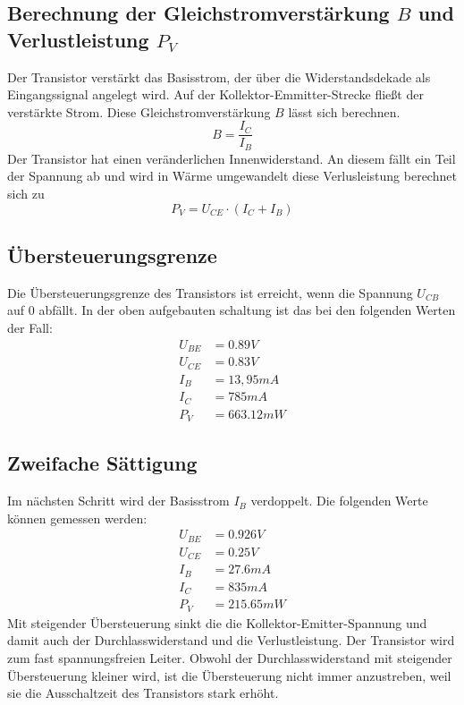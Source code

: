 \documentclass[
a4paper,     %
 headsepline, %
11pt         %
]{scrartcl}  %
\begin{document}
\subsection{Berechnung der Gleichstromverstärkung $B$ und Verlustleistung $P_V$}
Der Transistor verstärkt das Basisstrom, der über die Widerstandsdekade als Eingangssignal angelegt wird. Auf der Kollektor-Emmitter-Strecke fließt der verstärkte Strom. Diese Gleichstromverstärkung $B$ lässt sich berechnen.
\[B=\frac{I_C}{I_B}\]
Der Transistor hat einen veränderlichen Innenwiderstand. An diesem fällt ein Teil der Spannung ab und wird in Wärme umgewandelt diese Verlusleistung berechnet sich zu
\[P_V=U_{CE}\cdot(I_C+I_B)\]

\subsection{Übersteuerungsgrenze}
Die Übersteuerungsgrenze des Transistors ist erreicht, wenn die Spannung $U_{CB}$ auf $0$ abfällt. In der oben aufgebauten schaltung ist das bei den folgenden Werten der Fall:
\begin{align}
U_{BE} &= 0.89 V \nonumber \\
U_{CE} &= 0.83 V \nonumber \\
I_B    &= 13,95 mA \nonumber \\
I_C    &= 785 mA \nonumber \\
P_V    &= 663.12 mW \nonumber
\end{align}

\subsection{Zweifache Sättigung}
Im nächsten Schritt wird der Basisstrom $I_B$ verdoppelt. Die folgenden Werte können gemessen werden:
\begin{align}
U_{BE} &= 0.926 V \nonumber \\
U_{CE} &= 0.25 V \nonumber \\
I_B    &= 27.6 mA \nonumber \\
I_C    &= 835 mA \nonumber \\
P_V    &= 215.65 mW \nonumber
\end{align}
Mit steigender Übersteuerung sinkt die die Kollektor-Emitter-Spannung und damit auch der Durchlasswiderstand und die Verlustleistung. Der Transistor wird zum fast spannungsfreien Leiter. Obwohl der Durchlasswiderstand mit steigender Übersteuerung kleiner wird, ist die Übersteuerung nicht immer anzustreben, weil sie die Ausschaltzeit des Transistors stark erhöht.
\end{document}
